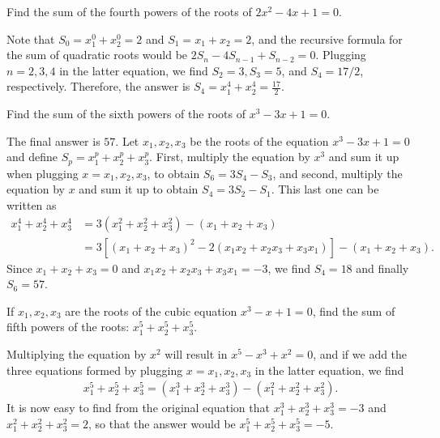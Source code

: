 \documentclass[12pt,a4paper]{memoir}
\theoremstyle{definition}
\begin{document}
\begin{question}
	Find the sum of the fourth powers of the roots of $2x^2-4x+1=0$.
\end{question}

\begin{solution}
	Note that $S_0=x_1^0+x_2^0=2$ and $S_1=x_1+x_2=2$, and the recursive formula for the sum of quadratic roots would be $2S_n-4S_{n-1}+S_{n-2}=0$. Plugging $n=2,3,4$ in the latter equation, we find $S_2=3, S_3=5$, and $S_4=17/2$, respectively. Therefore, the answer is $S_4=x_1^4+x_2^4=\frac{17}{2}$.
\end{solution}


\begin{question}
	Find the sum of the sixth powers of the roots of $x^3-3x+1=0$.
\end{question}

\begin{solution}[name=Soluion by Parviz Shahriari]
	The final answer is $57$. Let $x_1,x_2,x_3$ be the roots of the equation $x^3-3x+1=0$ and define $S_p=x_1^p+x_2^p+x_3^p$. First, multiply the equation by $x^3$ and sum it up when plugging $x=x_1,x_2,x_3$, to obtain $S_6=3S_4-S_3$, and second, multiply the equation by $x$ and sum it up to obtain $S_4=3S_2-S_1$. This last one can be written as
	\begin{align*}
		x_1^4+x_2^4+x_3^4 &= 3(x_1^2+x_2^2+x_3^2) - (x_1+x_2+x_3)\\
		&= 3\left[(x_1+x_2+x_3)^2-2(x_1x_2+x_2x_3+x_3x_1)\right] - (x_1+x_2+x_3).
	\end{align*}
	Since $x_1+x_2+x_3=0$ and $x_1x_2+x_2x_3+x_3x_1=-3$, we find $S_4=18$ and finally $S_6=57$.
\end{solution}

\begin{question}
	If $x_1,x_2,x_3$ are the roots of the cubic equation $x^3-x+1=0$, find the sum of fifth powers of the roots: $x_1^5+x_2^5+x_3^5$.
\end{question}

\begin{solution}
	Multiplying the equation by $x^2$ will result in $x^5-x^3+x^2=0$, and if we add the three equations formed by plugging $x=x_1,x_2,x_3$ in the latter equation, we find
	\begin{align*}
		x_1^5+x_2^5+x_3^5 = (x_1^3+x_2^3+x_3^3) - (x_1^2+x_2^2+x_3^2).
	\end{align*}
	It is now easy to find from the original equation that $x_1^3+x_2^3+x_3^3=-3$ and $x_1^2+x_2^2+x_3^2=2$, so that the answer would be $x_1^5+x_2^5+x_3^5=-5$.
\end{solution}
\end{document}
